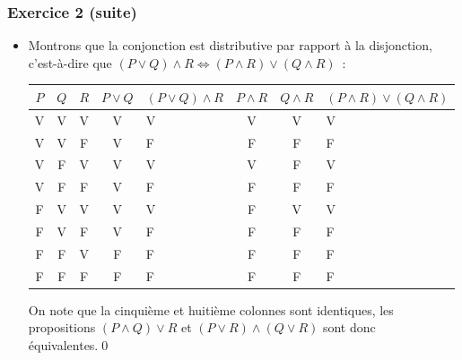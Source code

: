 \documentclass[10pt,notheorems]{beamer}
\theoremstyle{plain}
\theoremstyle{definition} %
\begin{document}
\begin{frame}
  \frametitle{Exercice 2 (suite)}
  \fontsize{8}{10}\selectfont

  \begin{itemize}

  \item Montrons que la conjonction est distributive par rapport à la disjonction, c'est-à-dire que $(P\lor Q)\land R \Leftrightarrow (P\land R) \lor (Q\land R)$~:\newline
  \begin{table}[H]
    \centering
    \begin{tabular}[H]{|ccc|cgccg|}
      \hline
      $P$ & $Q$ & $R$ & $P\lor Q$ & $(P\lor Q)\land R$ & $P\land R$ & $Q \land R$ & $(P\land R)\lor (Q \land R)$ \\ \hline
      V & V & V & V & V & V & V & V \\
      V & V & F & V & F & F & F & F \\
      V & F & V & V & V & V & F & V \\
      V & F & F & V & F & F & F & F \\
      F & V & V & V & V & F & V & V \\
      F & V & F & V & F & F & F & F \\
      F & F & V & F & F & F & F & F \\
      F & F & F & F & F & F & F & F \\
      \hline\hline
    \end{tabular}
  \end{table}

  \bigskip

  On note que la cinquième et huitième colonnes sont identiques, les propositions $(P\land Q)\lor R$ et $(P\lor R) \land (Q\lor R)$ sont donc équivalentes.\qed

  \end{itemize}

\end{frame}
\end{document}
